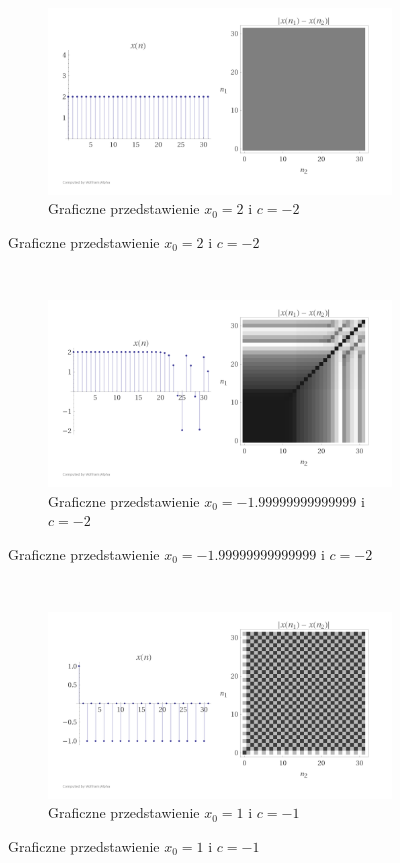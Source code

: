 \documentclass{article}
\begin{document}
\begin{figure}[ht]
	\centering
	\begin{subfigure}{1\textwidth}
		\centering
		\includegraphics[width=.8\linewidth]{WolfPlots/-2-2}  
		\caption*{Graficzne przedstawienie $x_{0}=2$ i $c = -2$ }
		
	\end{subfigure}
\end{figure}\\
\begin{figure}[ht]
\centering
\begin{subfigure}{1\textwidth}
	\centering
	\includegraphics[width=.8\linewidth]{WolfPlots/-2-19999999}  
	\caption*{Graficzne przedstawienie $x_{0}=-1.99999999999999$ i $c = -2$ }
	
\end{subfigure}
\end{figure}\\
\begin{figure}[ht]
	\centering
	\begin{subfigure}{1\textwidth}
		\centering
		\includegraphics[width=.8\linewidth]{WolfPlots/-1-1}  
		\caption*{Graficzne przedstawienie $x_{0}=1$ i $c = -1$ }
		
	\end{subfigure}
\end{figure}\\
\end{document}
